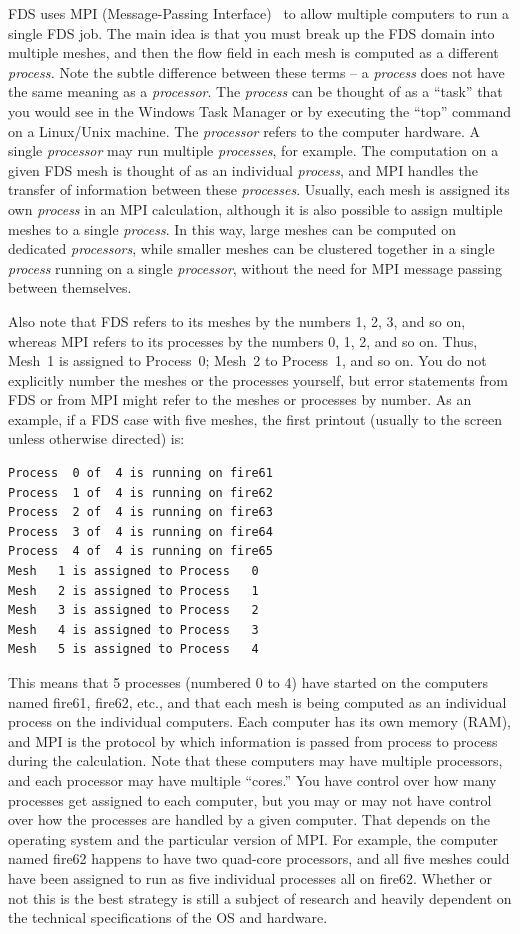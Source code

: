 \documentclass[11pt]{book}
\begin{document}
FDS uses MPI (Message-Passing Interface)~\cite{Gropp:1} to allow multiple computers to run a single FDS job. The main idea is that you must break up the FDS domain into multiple meshes, and then the flow field in each mesh is computed as a different {\em process.} Note the subtle difference between these terms -- a {\em process} does not have the same meaning as a {\em processor}. The {\em process} can be thought of as a ``task'' that you would see in
the Windows Task Manager or by executing the ``top'' command on a Linux/Unix machine. The {\em processor} refers to the computer hardware. A single {\em processor} may run multiple {\em processes}, for example. The computation on a given FDS mesh is thought of as an individual {\em process}, and MPI handles the transfer of information between these {\em processes}. Usually, each mesh is assigned its own {\em process} in an MPI calculation, although it is also possible to assign multiple meshes to a single {\em process}. In this way, large meshes can be computed on dedicated {\em processors}, while smaller meshes can be clustered together in a single {\em process} running on a single {\em processor}, without the need for MPI message passing between themselves.

Also note that FDS refers to its meshes by the numbers 1, 2, 3, and so on, whereas MPI refers to its processes by the numbers 0, 1, 2, and so on. Thus, Mesh~1 is assigned to Process~0; Mesh~2 to Process~1, and so on. You do not explicitly number the meshes or the processes yourself, but error statements from FDS or from MPI might refer to the meshes or processes by number. As an example, if a FDS case with five meshes, the first printout (usually to the screen unless otherwise directed) is:
\begin{lstlisting}
Process  0 of  4 is running on fire61
Process  1 of  4 is running on fire62
Process  2 of  4 is running on fire63
Process  3 of  4 is running on fire64
Process  4 of  4 is running on fire65
Mesh   1 is assigned to Process   0
Mesh   2 is assigned to Process   1
Mesh   3 is assigned to Process   2
Mesh   4 is assigned to Process   3
Mesh   5 is assigned to Process   4
\end{lstlisting}
This means that 5 processes (numbered 0 to 4) have started on the computers named fire61, fire62, etc., and that each mesh is being computed as an individual process on the individual computers. Each computer has its own memory (RAM), and MPI is the protocol by which information is passed from process to process during the calculation. Note that these computers may have multiple processors, and each processor may have multiple ``cores.'' You have control over how many processes get assigned to each computer, but you may or may not have control over how the processes are handled by a given computer. That depends on the operating system and the particular version of MPI. For example, the computer named fire62 happens to have two quad-core processors, and all five meshes could have been assigned to run as five individual processes all on fire62. Whether or not this is the best strategy is still a subject of research and heavily dependent on the technical specifications of the OS and hardware.
\end{document}
